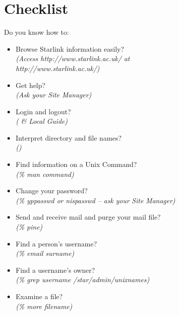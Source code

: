 \documentclass[twoside,11pt,nolof]{starlink}
\begin{document}
\newpage

\section {\label{AppendixB}Checklist}
Do you know how to:
\begin{itemize}
\item Browse Starlink information easily?\\
\hspace*{10mm} \emph{(Access
                                 {http://www.starlink.ac.uk/} at\\
\hspace*{10mm} http://www.starlink.ac.uk/)}
\item Get help?\\
\hspace*{10mm} \emph{(Ask your Site Manager)}
\item Login and logout?\\
\hspace*{10mm} \emph{( \& Local Guide)}
\item Interpret directory and file names?\\
\hspace*{10mm} \emph{()}
\item Find information on a Unix Command?\\
\hspace*{10mm} \emph{(\% man command)}
\item Change your password?\\
\hspace*{10mm} \emph{(\% yppasswd or nispasswd -- ask your Site Manager)}
\item Send and receive mail and purge your mail file?\\
\hspace*{10mm} \emph{(\% pine)}
\item Find a person's username?\\
\hspace*{10mm} \emph{(\% email surname)}
\item Find a username's owner?\\
\hspace*{10mm} \emph{(\% grep username /star/\-admin/\-unixnames)}
\item Examine a file?\\
\hspace*{10mm} \emph{(\% more filename)}

\end{itemize}
\end{document}
